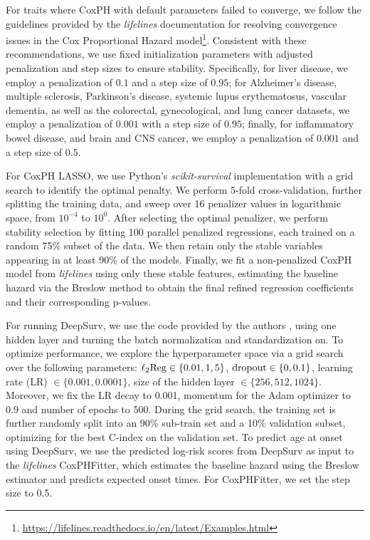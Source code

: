 For traits where CoxPH with default parameters failed to converge, we follow the guidelines provided by the \textit{lifelines} documentation for resolving convergence issues in the Cox Proportional Hazard model\footnote{\url{https://lifelines.readthedocs.io/en/latest/Examples.html}}. Consistent with these recommendations, we use fixed initialization parameters with adjusted penalization and step sizes to ensure stability. Specifically, for liver disease, we employ a penalization of $0.1$ and a step size of $0.95$; for Alzheimer's disease, multiple sclerosis, Parkinson's disease, systemic lupus erythematosus, vascular dementia, as well as the colorectal, gynecological, and lung cancer datasets, we employ a penalization of $0.001$ with a step size of $0.95$; finally, for inflammatory bowel disease, and brain and CNS cancer, we employ a penalization of $0.001$ and a step size of $0.5$.

For CoxPH LASSO, we use Python's \textit{scikit-survival} \cite{sksurv} implementation with a grid search to identify the optimal penalty. We perform 5-fold cross-validation, further splitting the training data, and sweep over 16 penalizer values in logarithmic space, from $10^{-4}$ to $10^{0}$. After selecting the optimal penalizer, we perform stability selection \cite{meinshausen_stability_2010} by fitting 100 parallel penalized regressions, each trained on a random 75\% subset of the data. We then retain only the stable variables appearing in at least 90\% of the models. Finally, we fit a non-penalized CoxPH model from \textit{lifelines} using only these stable features, estimating the baseline hazard via the Breslow method to obtain the final refined regression coefficients and their corresponding p-values.

For running DeepSurv, we use the code provided by the authors \cite{katzman_deepsurv_2018}, using one hidden layer and turning the batch normalization and standardization on. To optimize performance, we explore the hyperparameter space via a grid search over the following parameters: $\ell_2{\rm Reg}\in \{0.01,1,5\}$, ${\rm dropout}\in \{0, 0.1 \}$, learning rate (LR) $\in \{0.001, 0.0001 \}$, size of the hidden layer $\in \{256,512,1024\}$. Moreover, we fix the LR decay to 0.001, momentum for the Adam optimizer to 0.9 and number of epochs to 500. During the grid search, the training set is further randomly split into an 90\% sub-train set and a 10\% validation subset, optimizing for the best C-index on the validation set. To predict age at onset using DeepSurv, we use the predicted log-risk scores from DeepSurv as input to the \textit{lifelines} CoxPHFitter, which estimates the baseline hazard using the Breslow estimator and predicts expected onset times. For CoxPHFitter, we set the step size to 0.5.

